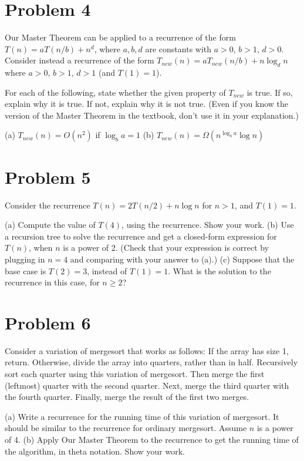 \documentclass{article}
\begin{document}
\section*{Problem 4}
Our Master Theorem can be applied to a recurrence of the form $T(n) = aT(n/b) + n^d$, where $a, b, d$ are constants with $a > 0$, $b > 1$, $d > 0$. Consider instead a recurrence of the form $T_{new}(n) = aT_{new}(n/b) + n \log_d n$ where $a > 0$, $b > 1$, $d > 1$ (and $T(1) = 1$).

For each of the following, state whether the given property of $T_{new}$ is true. If so, explain why it is true. If not, explain why it is not true. (Even if you know the version of the Master Theorem in the textbook, don’t use it in your explanation.)

(a) $T_{new}(n) = O(n^2)$ if $\log_b a = 1$
(b) $T_{new}(n) = \Omega(n^{\log_b a} \log n)$

\section*{Problem 5}
Consider the recurrence $T(n) = 2T(n/2) + n \log n$ for $n > 1$, and $T(1) = 1$.

(a) Compute the value of $T(4)$, using the recurrence. Show your work.
(b) Use a recursion tree to solve the recurrence and get a closed-form expression for $T(n)$, when $n$ is a power of 2. (Check that your expression is correct by plugging in $n = 4$ and comparing with your answer to (a).)
(c) Suppose that the base case is $T(2) = 3$, instead of $T(1) = 1$. What is the solution to the recurrence in this case, for $n \ge 2$?

\section*{Problem 6}
Consider a variation of mergesort that works as follows: If the array has size 1, return. Otherwise, divide the array into quarters, rather than in half. Recursively sort each quarter using this variation of mergesort. Then merge the first (leftmost) quarter with the second quarter. Next, merge the third quarter with the fourth quarter. Finally, merge the result of the first two merges.

(a) Write a recurrence for the running time of this variation of mergesort. It should be similar to the recurrence for ordinary mergesort. Assume $n$ is a power of 4.
(b) Apply Our Master Theorem to the recurrence to get the running time of the algorithm, in theta notation. Show your work.
\end{document}

